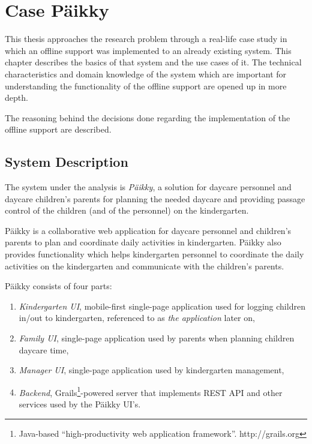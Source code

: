 
\chapter{Case Päikky}

This thesis approaches the research problem through a real-life case study in which an offline support was implemented to an already existing system. This chapter describes the basics of that system and the use cases of it. The technical characteristics and domain knowledge of the system which are important for understanding the functionality of the offline support are opened up in more depth. 

The reasoning behind the decisions done regarding the implementation of the offline support are described.


\section{System Description}

The system under the analysis is \textit{Päikky}, a solution for daycare personnel and daycare children’s parents for planning the needed daycare and providing passage control of the children (and of the personnel) on the kindergarten. 

Päikky is a collaborative web application for daycare personnel and children's parents to plan and coordinate daily activities in kindergarten. Päikky also provides functionality which helps kindergarten personnel to coordinate the daily activities on the kindergarten and communicate with the children's parents.

Päikky consists of four parts:

\begin{enumerate}
	\item \textit{Kindergarten UI}, mobile-first single-page application used for logging children in/out to kindergarten, referenced to as \textit{the application} later on,
	\item \textit{Family UI}, single-page application used by parents when planning children daycare time,
	\item \textit{Manager UI}, single-page application used by kindergarten management,
	\item \textit{Backend}, Grails\footnote{Java-based ``high-productivity web application framework''. http://grails.org}-powered server that implements REST API and other services used by the Päikky UI's.
\end{enumerate}

